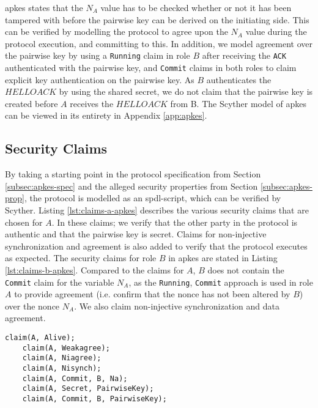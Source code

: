 \gls{apkes} states that the $N_A$ value has to be checked whether or not it has been tampered with before the pairwise key can be derived on the initiating side. This can be verified by modelling the protocol to agree upon the $N_A$ value during the protocol execution, and committing to this. In addition, we model agreement over the pairwise key by using a \texttt{Running} claim in role $B$ after receiving the \texttt{ACK} authenticated with the pairwise key, and \texttt{Commit} claims in both roles to claim explicit key authentication on the pairwise key. As $B$ authenticates the $HELLOACK$ by using the shared secret, we do not claim that the pairwise key is created before $A$ receives the $HELLOACK$ from B. The Scyther model of \gls{apkes} can be viewed in its entirety in Appendix \ref{app:apkes}.

\subsection{Security Claims}

By taking a starting point in the protocol specification from Section \ref{subsec:apkes-spec} and the alleged security properties from Section \ref{subsec:apkes-prop}, the protocol is modelled as an \gls{spdl}-script, which can be verified by Scyther. Listing \ref{lst:claims-a-apkes} describes the various security claims that are chosen for $A$. In these claims; we verify that the other party in the protocol is authentic and that the pairwise key is secret. Claims for non-injective synchronization and agreement is also added to verify that the protocol executes as expected. The security claims for role $B$ in \gls{apkes} are stated in Listing \ref{lst:claims-b-apkes}. Compared to the claims for $A$, $B$ does not contain the \texttt{Commit} claim for the variable $N_A$, as the \texttt{Running}, \texttt{Commit} approach is used in role $A$ to provide agreement (i.e. confirm that the nonce has not been altered by $B$) over the nonce $N_A$. We also claim non-injective synchronization and data agreement.\\

\begin{lstlisting}[caption={Security claims for role A in APKES.}, label={lst:claims-a-apkes}, style=code-listings]
	claim(A, Alive);
	claim(A, Weakagree);
	claim(A, Niagree);
	claim(A, Nisynch);
	claim(A, Commit, B, Na);
	claim(A, Secret, PairwiseKey);
	claim(A, Commit, B, PairwiseKey);
\end{lstlisting}


